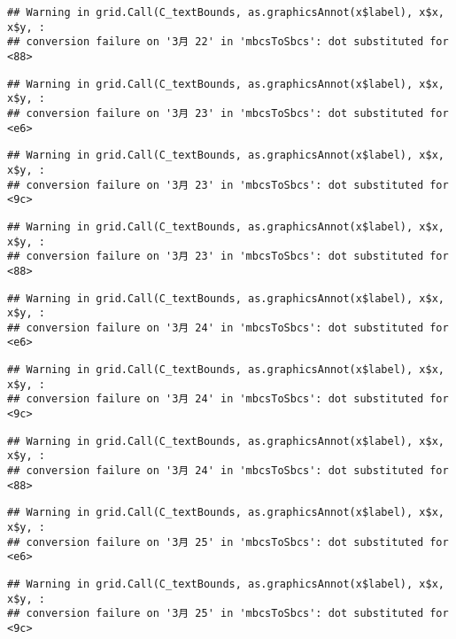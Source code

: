 \documentclass[
]{article}
\begin{document}
\begin{verbatim}
## Warning in grid.Call(C_textBounds, as.graphicsAnnot(x$label), x$x, x$y, :
## conversion failure on '3月 22' in 'mbcsToSbcs': dot substituted for <88>
\end{verbatim}

\begin{verbatim}
## Warning in grid.Call(C_textBounds, as.graphicsAnnot(x$label), x$x, x$y, :
## conversion failure on '3月 23' in 'mbcsToSbcs': dot substituted for <e6>
\end{verbatim}

\begin{verbatim}
## Warning in grid.Call(C_textBounds, as.graphicsAnnot(x$label), x$x, x$y, :
## conversion failure on '3月 23' in 'mbcsToSbcs': dot substituted for <9c>
\end{verbatim}

\begin{verbatim}
## Warning in grid.Call(C_textBounds, as.graphicsAnnot(x$label), x$x, x$y, :
## conversion failure on '3月 23' in 'mbcsToSbcs': dot substituted for <88>
\end{verbatim}

\begin{verbatim}
## Warning in grid.Call(C_textBounds, as.graphicsAnnot(x$label), x$x, x$y, :
## conversion failure on '3月 24' in 'mbcsToSbcs': dot substituted for <e6>
\end{verbatim}

\begin{verbatim}
## Warning in grid.Call(C_textBounds, as.graphicsAnnot(x$label), x$x, x$y, :
## conversion failure on '3月 24' in 'mbcsToSbcs': dot substituted for <9c>
\end{verbatim}

\begin{verbatim}
## Warning in grid.Call(C_textBounds, as.graphicsAnnot(x$label), x$x, x$y, :
## conversion failure on '3月 24' in 'mbcsToSbcs': dot substituted for <88>
\end{verbatim}

\begin{verbatim}
## Warning in grid.Call(C_textBounds, as.graphicsAnnot(x$label), x$x, x$y, :
## conversion failure on '3月 25' in 'mbcsToSbcs': dot substituted for <e6>
\end{verbatim}

\begin{verbatim}
## Warning in grid.Call(C_textBounds, as.graphicsAnnot(x$label), x$x, x$y, :
## conversion failure on '3月 25' in 'mbcsToSbcs': dot substituted for <9c>
\end{verbatim}
\end{document}
